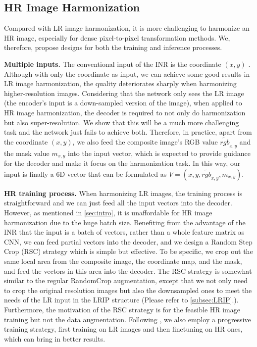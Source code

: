 \documentclass[10pt,journal,twocolumn,twoside]{IEEEtran}
\begin{document}
\subsection{HR Image Harmonization}
\label{subsec:specific}

Compared with LR image harmonization, it is more challenging to harmonize an HR image, especially for dense pixel-to-pixel transformation methods. We, therefore, propose designs for both the training and inference processes.

\textbf{Multiple inputs.} The conventional input of the INR is the coordinate $(x, y)$ \cite{tancik2020fourier, sitzmann2020implicit, skorokhodov2021adversarial, anokhin2021image}. Although with only the coordinate as input, we can achieve some good results in LR image harmonization, the quality deteriorates sharply when harmonizing higher-resolution images. Considering that the network only sees the LR image (the encoder's input is a down-sampled version of the image), when applied to HR image harmonization, the decoder is required to not only do harmonization but also super-resolution. We show that this will be a much more challenging task and the network just fails to achieve both. Therefore, in practice, apart from the coordinate $(x, y)$, we also feed the composite image's RGB value $\widetilde{rgb}_{x, y}$ and the mask value $m_{x, y}$ into the input vector, which is expected to provide guidance for the decoder and make it focus on the harmonization task. In this way, our input is finally a 6D vector that can be formulated as $V=(x, y, \widetilde{rgb}_{x, y}, m_{x, y})$.

\textbf{HR training process.} When harmonizing LR images, the training process is straightforward and we can just feed all the input vectors into the decoder. However, as mentioned in \cref{sec:intro}, it is unaffordable for HR image harmonization due to the huge batch size. Benefiting from the advantage of the INR that the input is a batch of vectors, rather than a whole feature matrix as CNN, we can feed partial vectors into the decoder, and we design a Random Step Crop (RSC) strategy which is simple but effective. To be specific, we crop out the same local area from the composite image, the coordinate map, and the mask, and feed the vectors in this area into the decoder. The RSC strategy is somewhat similar to the regular RandomCrop augmentation, except that we not only need to crop the original resolution images but also the downsampled ones to meet the needs of the LR input in the LRIP structure (Please refer to \cref{subsec:LRIP}.). Furthermore, the motivation of the RSC strategy is for the feasible HR image training but not the data augmentation. Following \cite{xue2022dccf}, we also employ a progressive training strategy, first training on LR images and then finetuning on HR ones, which can bring in better results.
\end{document}
